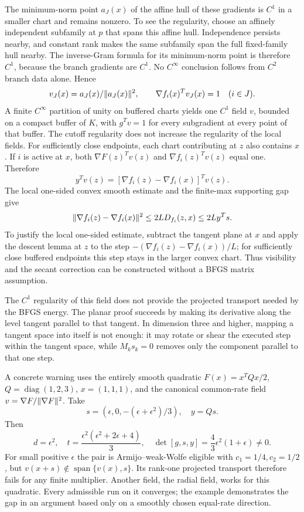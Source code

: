 The minimum-norm point $a_J(x)$ of the affine hull of these gradients is $C^1$ in a smaller chart and remains nonzero. To see the regularity, choose an affinely independent subfamily at $p$ that spans this affine hull. Independence persists nearby, and constant rank makes the same subfamily span the full fixed-family hull nearby. The inverse-Gram formula for its minimum-norm point is therefore $C^1$, because the branch gradients are $C^1$. No $C^\infty$ conclusion follows from $C^2$ branch data alone. Hence
\[
 v_J(x)=a_J(x)/\lVert a_J(x)\rVert^2,
 \qquad \nabla f_i(x)^Tv_J(x)=1\quad(i\in J).
\]
A finite $C^\infty$ partition of unity on buffered charts yields one $C^1$ field $v$, bounded on a compact buffer of $K$, with $g^Tv=1$ for every subgradient at every point of that buffer. The cutoff regularity does not increase the regularity of the local fields. For sufficiently close endpoints, each chart contributing at $z$ also contains $x$. If $i$ is active at $x$, both $\nabla F(z)^Tv(z)$ and $\nabla f_i(z)^Tv(z)$ equal one. Therefore
\[
 y^Tv(z)=[\nabla f_i(z)-\nabla f_i(x)]^Tv(z).
\]
The local one-sided convex smooth estimate and the finite-max supporting gap give
\[
 \lVert \nabla f_i(z)-\nabla f_i(x)\rVert^2
 \le2L D_{f_i}(z,x)\le2L y^Ts.
\]
To justify the local one-sided estimate, subtract the tangent plane at $x$ and apply the descent lemma at $z$ to the step $-(\nabla f_i(z)-\nabla f_i(x))/L$; for sufficiently close buffered endpoints this step stays in the larger convex chart. Thus visibility and the secant correction can be constructed without a BFGS matrix assumption.

The $C^1$ regularity of this field does not provide the projected transport needed by the BFGS energy. The planar proof succeeds by making its derivative along the level tangent parallel to that tangent. In dimension three and higher, mapping a tangent space into itself is not enough: it may rotate or shear the executed step within the tangent space, while $M_ks_k=0$ removes only the component parallel to that one step.

A concrete warning uses the entirely smooth quadratic $F(x)=x^TQx/2$, $Q=\operatorname{diag}(1,2,3)$, $x=(1,1,1)$, and the canonical common-rate field $v=\nabla F/\lVert \nabla F\rVert^2$. Take
\[
 s=(\epsilon,0,-(\epsilon+\epsilon^2)/3),\quad y=Qs.
\]
Then
\[
 d=\epsilon^2,\quad t=\frac{\epsilon^2(\epsilon^2+2\epsilon+4)}3,\quad
 \det[g,s,y]=\frac43\epsilon^2(1+\epsilon)\ne0.
\]
For small positive $\epsilon$ the pair is Armijo--weak-Wolfe eligible with $c_1=1/4,c_2=1/2$, but $v(x+s)\notin\operatorname{span}\{v(x),s\}$. Its rank-one projected transport therefore fails for any finite multiplier. Another field, the radial field, works for this quadratic. Every admissible run on it converges; the example demonstrates the gap in an argument based only on a smoothly chosen equal-rate direction.



